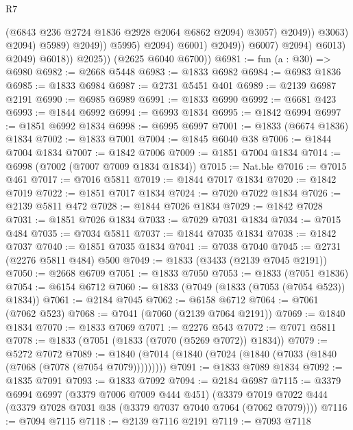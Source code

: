 \begin{lexlean}{R7}
\begin{coremodule}
                                                (@6843 @236 @2724 @1836 @2928 @2064 @6862 @2094)
                                                @3057)
                                              @2049))
                                          @3063)
                                        @2094)
                                      @5989)
                                    @2049))
                                @5995)
                              @2094)
                            @6001)
                          @2049))
                      @6007)
                    @2094)
                  @6013)
                @2049)
              @6018))
          @2025))
      (@2625 @6040 @6700))
@6981 := fun (a : @30) => @6980
@6982 := @2668 @5448
@6983 := @1833 @6982
@6984 := @6983 @1836
@6985 := @1833 @6984
@6987 := @2731 @5451 @401
@6989 := @2139 @6987 @2191
@6990 := @6985 @6989
@6991 := @1833 @6990
@6992 := @6681 @423
@6993 := @1844 @6992
@6994 := @6993 @1834
@6995 := @1842 @6994
@6997 := @1851 @6992 @1834
@6998 := @6995 @6997
@7001 := @1833 (@6674 @1836) @1834
@7002 := @1833 @7001
@7004 := @1845 @6040 @38
@7006 := @1844 @7004 @1834
@7007 := @1842 @7006
@7009 := @1851 @7004 @1834
@7014 := @6998 (@7002 (@7007 @7009 @1834 @1834))
@7015 := Nat.ble
@7016 := @7015 @461
@7017 := @7016 @5811
@7019 := @1844 @7017 @1834
@7020 := @1842 @7019
@7022 := @1851 @7017 @1834
@7024 := @7020 @7022 @1834
@7026 := @2139 @5811 @472
@7028 := @1844 @7026 @1834
@7029 := @1842 @7028
@7031 := @1851 @7026 @1834
@7033 := @7029 @7031 @1834
@7034 := @7015 @484
@7035 := @7034 @5811
@7037 := @1844 @7035 @1834
@7038 := @1842 @7037
@7040 := @1851 @7035 @1834
@7041 := @7038 @7040
@7045 := @2731 (@2276 @5811 @484) @500
@7049 := @1833 (@3433 (@2139 @7045 @2191))
@7050 := @2668 @6709
@7051 := @1833 @7050
@7053 := @1833 (@7051 @1836)
@7054 := @6154 @6712
@7060 := @1833 (@7049 (@1833 (@7053 (@7054 @523)) @1834))
@7061 := @2184 @7045
@7062 := @6158 @6712
@7064 := @7061 (@7062 @523)
@7068 := @7041 (@7060 (@2139 @7064 @2191))
@7069 := @1840 @1834
@7070 := @1833 @7069
@7071 := @2276 @543
@7072 := @7071 @5811
@7078 := @1833 (@7051 (@1833 (@7070 (@5269 @7072)) @1834))
@7079 := @5272 @7072
@7089 := @1840 (@7014 (@1840 (@7024 (@1840 (@7033 (@1840 (@7068 (@7078 (@7054 @7079)))))))))
@7091 := @1833 @7089 @1834
@7092 := @1835 @7091
@7093 := @1833 @7092
@7094 := @2184 @6987
@7115 := @3379
    @6994
    @6997
    (@3379 @7006 @7009 @444 @451)
    (@3379 @7019 @7022 @444 (@3379 @7028 @7031 @38 (@3379 @7037 @7040 @7064 (@7062 @7079))))
@7116 := @7094 @7115
@7118 := @2139 @7116 @2191
@7119 := @7093 @7118

\end{coremodule}
\end{lexlean}
